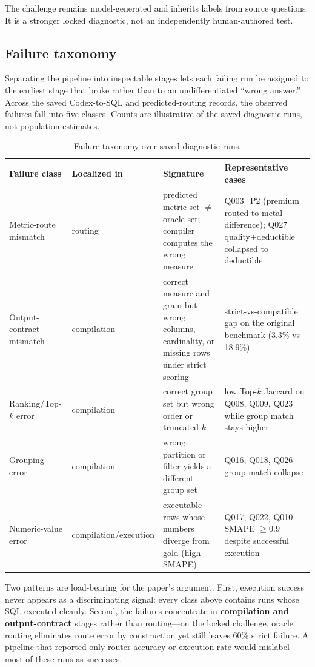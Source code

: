 \documentclass[11pt]{article}
\begin{document}
The challenge remains model-generated and inherits labels from source questions.
It is a stronger locked diagnostic, not an independently human-authored test.

\subsection{Failure taxonomy}
Separating the pipeline into inspectable stages lets each failing run be assigned
to the earliest stage that broke rather than to an undifferentiated ``wrong
answer.'' Across the saved Codex-to-SQL and predicted-routing records, the
observed failures fall into five classes. Counts are illustrative of the saved
diagnostic runs, not population estimates.

\begin{table}[h]
\centering\footnotesize
\renewcommand{\arraybackslash}{}
\begin{tabularx}{\textwidth}{@{}p{2.3cm} p{1.7cm} X X@{}}
\toprule
Failure class & Localized in & Signature & Representative cases \\
\midrule
Metric-route mismatch & routing & predicted metric set $\neq$ oracle set; compiler computes the wrong measure & Q003\_P2 (premium routed to metal-difference); Q027 quality+deductible collapsed to deductible \\
\addlinespace
Output-contract mismatch & compilation & correct measure and grain but wrong columns, cardinality, or missing rows under strict scoring & strict-vs-compatible gap on the original benchmark (3.3\% vs 18.9\%) \\
\addlinespace
Ranking/Top-$k$ error & compilation & correct group set but wrong order or truncated $k$ & low Top-$k$ Jaccard on Q008, Q009, Q023 while group match stays higher \\
\addlinespace
Grouping error & compilation & wrong partition or filter yields a different group set & Q016, Q018, Q026 group-match collapse \\
\addlinespace
Numeric-value error & compilation/execution & executable rows whose numbers diverge from gold (high SMAPE) & Q017, Q022, Q010 SMAPE $\geq 0.9$ despite successful execution \\
\bottomrule
\end{tabularx}
\caption{Failure taxonomy over saved diagnostic runs.}
\label{tab:failures}
\end{table}

Two patterns are load-bearing for the paper's argument. First, execution success
never appears as a discriminating signal: every class above contains runs whose
SQL executed cleanly. Second, the failures concentrate in \textbf{compilation and
output-contract} stages rather than routing---on the locked challenge, oracle
routing eliminates route error by construction yet still leaves 60\% strict
failure. A pipeline that reported only router accuracy or execution rate would
mislabel most of these runs as successes.
\end{document}
